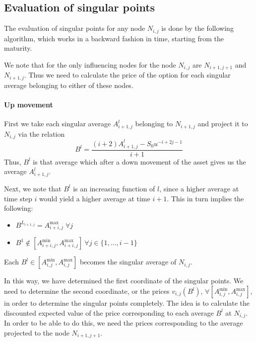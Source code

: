 \subsection{Evaluation of singular points}
\label{sec:sp-eval}

The evaluation of singular points for any node $ N_{i,j} $ is done by the following algorithm, which works in a backward fashion in time, starting from the maturity.

We note that for the only influencing nodes for the node $ N_{i,j} $ are $ N_{i+1,j+1} $ and $ N_{i+1,j} $. Thus we need to calculate the price of the option for each singular average belonging to either of these nodes.


\paragraph{Up movement}

First we take each singular average $ A_{i+1,j}^l $ belonging to $ N_{i+1,j} $ and project it to $ N_{i,j} $ via the relation
\begin{equation}
	\label{eq:sp-proj-up}
	B^l = \frac{ ( i+2) A_{i+1,j}^l - S_0 u^{-i+2j-1} }{ i+1 }
\end{equation}
Thus, $ B^l $ is that average which after a down movement of the asset gives us the average $ A_{i+1,j}^l $.

Next, we note that $ B^l $ is an increasing function of $ l $, since a higher average at time step $ i $ would yield a higher average at time $ i+1 $. This in turn implies the following:
\begin{itemize}
\item $ B^{L_{i+1,j}} = A_{i+i,j}^{\max} \; \forall j $
\item $ B^1 \notin \left[ A_{i+i,j}^{\min}, A_{i+i,j}^{\max} \right] \ \forall j \in \{1, \dots, i-1 \} $
\end{itemize}
Each $ B^l \in \left[ A_{i,j}^{\min}, A_{i,j}^{\max} \right] $ becomes the singular average of $ N_{i,j} $.

In this way, we have determined the first coordinate of the singular points. We need to determine the second coordinate, or the prices $ v_{i,j}(B^l) $, $ \forall \left[ A_{i,j}^{\min}, A_{i,j}^{\max} \right] $, in order to determine the singular points completely. The idea is to calculate the discounted expected value of the price corresponding to each average $ B^l $ at $ N_{i,j} $. In order to be able to do this, we need the prices corresponding to the average projected to the node $ N_{i+1,j+1} $.

